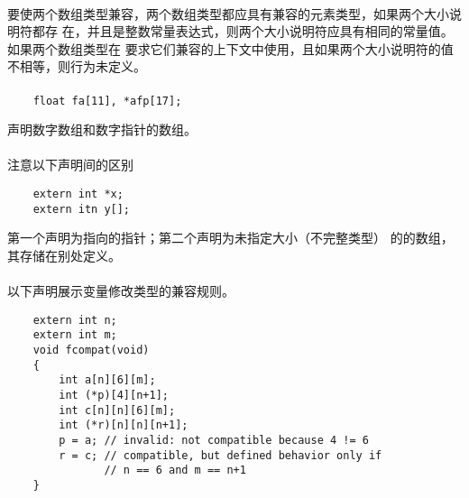 \paragraph{}
要使两个数组类型兼容，两个数组类型都应具有兼容的元素类型，如果两个大小说明符都存
在，并且是整数常量表达式，则两个大小说明符应具有相同的常量值。如果两个数组类型在
要求它们兼容的上下文中使用，且如果两个大小说明符的值不相等，则行为未定义。

\paragraph{}
\ex
\begin{lstlisting}
    float fa[11], *afp[17];
\end{lstlisting}
声明数字数组和数字指针的数组。

\paragraph{}
\ex 注意以下声明间的区别
\begin{lstlisting}
    extern int *x;
    extern itn y[];
\end{lstlisting}
第一个声明为指向的指针；第二个声明为未指定大小（不完整类型）
的的数组，其存储在别处定义。

\paragraph{}
\ex 以下声明展示变量修改类型的兼容规则。
\begin{lstlisting}
    extern int n;
    extern int m;
    void fcompat(void)
    {
        int a[n][6][m];
        int (*p)[4][n+1];
        int c[n][n][6][m];
        int (*r)[n][n][n+1];
        p = a; // invalid: not compatible because 4 != 6
        r = c; // compatible, but defined behavior only if
               // n == 6 and m == n+1
    }
\end{lstlisting}

